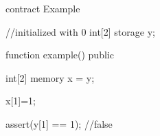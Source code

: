 \begin{soliditybox}
contract Example {
  //initialized with 0
  int[2] storage y;
        
  function example() public {
    int[2] memory x = y;

    x[1]=1;

    assert(y[1] == 1); //false
  }
}
\end{soliditybox}